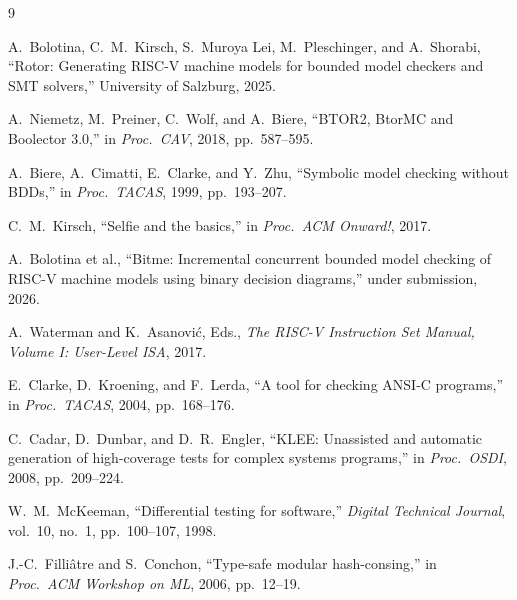 \documentclass[sigplan,screen,nonacm]{acmart}
\begin{document}
\begin{thebibliography}{9}

A.~Bolotina, C.~M.~Kirsch, S.~Muroya Lei, M.~Pleschinger, and
A.~Shorabi, ``Rotor: Generating RISC-V machine models for bounded model
checkers and SMT solvers,'' University of Salzburg, 2025.

A.~Niemetz, M.~Preiner, C.~Wolf, and A.~Biere, ``BTOR2, BtorMC and
Boolector 3.0,'' in \emph{Proc.\ CAV}, 2018, pp.~587--595.

A.~Biere, A.~Cimatti, E.~Clarke, and Y.~Zhu, ``Symbolic model checking
without BDDs,'' in \emph{Proc.\ TACAS}, 1999, pp.~193--207.

C.~M.~Kirsch, ``Selfie and the basics,'' in \emph{Proc.\ ACM Onward!},
2017.

A.~Bolotina et al., ``Bitme: Incremental concurrent bounded model
checking of RISC-V machine models using binary decision diagrams,''
under submission, 2026.

A.~Waterman and K.~Asanovi\'{c}, Eds., \emph{The RISC-V Instruction Set
Manual, Volume I: User-Level ISA}, 2017.

E.~Clarke, D.~Kroening, and F.~Lerda, ``A tool for checking ANSI-C
programs,'' in \emph{Proc.\ TACAS}, 2004, pp.~168--176.

C.~Cadar, D.~Dunbar, and D.~R.~Engler, ``KLEE: Unassisted and automatic
generation of high-coverage tests for complex systems programs,'' in
\emph{Proc.\ OSDI}, 2008, pp.~209--224.

W.~M.~McKeeman, ``Differential testing for software,'' \emph{Digital
Technical Journal}, vol.~10, no.~1, pp.~100--107, 1998.

J.-C.~Filli\^{a}tre and S.~Conchon, ``Type-safe modular hash-consing,''
in \emph{Proc.\ ACM Workshop on ML}, 2006, pp.~12--19.

\end{thebibliography}
\end{document}
